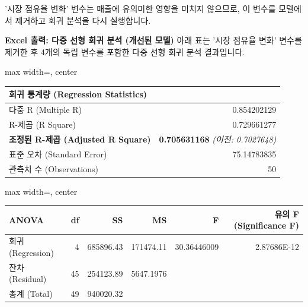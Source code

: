 \documentclass[11pt,a4paper]{book}
\theoremstyle{definition}
\begin{document}
\begin{tcolorbox}[title={\textbf{모델 개선: 유의미하지 않은 변수 제거}}]
'시장 점유율 변화' 변수는 매출에 유의미한 영향을 미치지 않으므로, 이 변수를 모델에서 제거하고 회귀 분석을 다시 실행합니다.

\textbf{Excel 출력: 다중 선형 회귀 분석 (개선된 모델)}
아래 표는 '시장 점유율 변화' 변수를 제거한 후 4개의 독립 변수를 포함한 다중 선형 회귀 분석 결과입니다.

\begin{adjustbox}{max width=\textwidth, center}
\begin{tabular}{l r}
\toprule
\textbf{회귀 통계량 (Regression Statistics)} & \\
\midrule
다중 R (Multiple R) & 0.854202129 \\
R-제곱 (R Square) & 0.729661277 \\
\textbf{조정된 R-제곱 (Adjusted R Square)} & \textbf{0.705631168} \quad \textit{(이전: 0.7027648)} \\
표준 오차 (Standard Error) & 75.14783835 \\
관측치 수 (Observations) & 50 \\
\bottomrule
\end{tabular}
\end{adjustbox}

\vspace{0.5em}

\begin{adjustbox}{max width=\textwidth, center}
\begin{tabular}{l r r r r r}
\toprule
\textbf{ANOVA} & \textbf{df} & \textbf{SS} & \textbf{MS} & \textbf{F} & \textbf{유의 F (Significance F)} \\
\midrule
회귀 (Regression) & 4 & 685896.43 & 171474.11 & 30.36446009 & 2.87686E-12 \\
잔차 (Residual) & 45 & 254123.89 & 5647.1976 & & \\
총계 (Total) & 49 & 940020.32 & & & \\
\bottomrule
\end{tabular}
\end{adjustbox}

\vspace{0.5em}


\end{tcolorbox}
\end{document}
